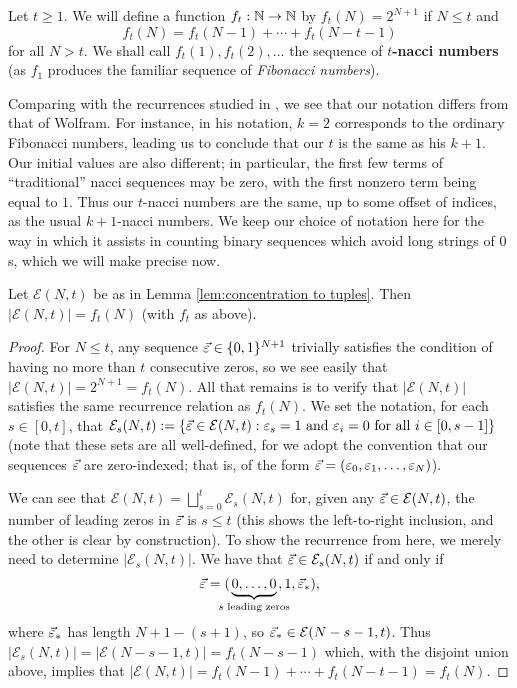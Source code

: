 \begin{defn} \label{def:nacci numbers}
Let $t\ge 1$.
We will define a function $f_t: \mathbb{N} \to \mathbb{N}$ by $f_t(N) = 2^{N+1}$ if $N\le t$ and 
\[ f_t(N) = f_t(N-1) + \cdots + f_t(N-t-1) \]
for all $N>t$.
We shall call $f_t(1), f_t(2),\dots$ the sequence of \textbf{$t$-nacci numbers} (as $f_1$ produces the familiar sequence of \textit{Fibonacci numbers}).
\end{defn}
Comparing with the recurrences studied in \cite{wolfram98}, we see that our notation differs from that of Wolfram.
For instance, in his notation, $k=2$ corresponds to the ordinary Fibonacci numbers, leading us to conclude that our $t$ is the same as his $k+1$.
Our initial values are also different; in particular, the first few terms of ``traditional'' nacci sequences may be zero, with the first nonzero term being equal to $1$. 
Thus our $t$-nacci numbers are the same, up to some offset of indices, as the usual $k+1$-nacci numbers.
We keep our choice of notation here for the way in which it assists in counting binary sequences which avoid long strings of $0$s, which we will make precise now.

\begin{prop} \label{lem:nacci numbers count tuples}
Let $\mathcal{E}(N,t)$ be as in Lemma \ref{lem:concentration to tuples}. Then $|\mathcal{E}(N,t)| = f_t(N)$ (with $f_t$ as above).
\end{prop}
\begin{proof}
For $N\le t$, any sequence $\vec{\varepsilon}\in \{0,1\}^{N+1}$ trivially satisfies the condition of having no more than $t$ consecutive zeros, so we see easily that $|\mathcal{E}(N,t)| = 2^{N+1} = f_t(N)$.  
All that remains is to verify that $|\mathcal{E}(N,t)|$ satisfies the same recurrence relation as $f_t(N)$.
We set the notation, for each $s \in [0,t]$, that $\mathcal{E}_s(N,t) := \{\vec{\varepsilon}\in \mathcal{E}(N,t): \varepsilon_s = 1 \textrm{ and } \varepsilon_i = 0 \textrm{ for all $i\in [0,s-1]$} \}$ (note that these sets are all well-defined, for we adopt the convention that our sequences $\vec{\varepsilon}$ are zero-indexed; that is, of the form $\vec{\varepsilon} = (\varepsilon_0,\varepsilon_1,\dots, \varepsilon_N)$).

We can see that $\mathcal{E}(N,t) = \bigsqcup_{s=0}^t \mathcal{E}_s(N,t)$ for, given any $\vec{\varepsilon}\in \mathcal{E}(N,t)$, the number of leading zeros in $\vec{\varepsilon}$ is $s\le t$ (this shows the left-to-right inclusion, and the other is clear by construction).
To show the recurrence from here, we merely need to determine $|\mathcal{E}_s(N,t)|$.
We have that $\vec{\varepsilon}\in \mathcal{E}_s(N,t)$ if and only if 
\[\vec{\e} = (\!\!\!\!\!\underbrace{0,\dots,0}_{s \textrm{ leading zeros}}\!\!\!\!\!, 1, \vec{\e}_*),\]
 where $\vec{\varepsilon}_*$ has length $N+1 - (s+1)$, so $\vec{\varepsilon}_*\in \mathcal{E}(N-s-1,t)$.
 Thus $|\mathcal{E}_s(N,t)| = |\mathcal{E}(N-s-1,t)|=f_t(N-s-1)$ which, with the disjoint union above, implies that $|\mathcal{E}(N,t)| = f_t(N-1) + \cdots + f_t(N-t-1) = f_t(N)$.
\end{proof}

